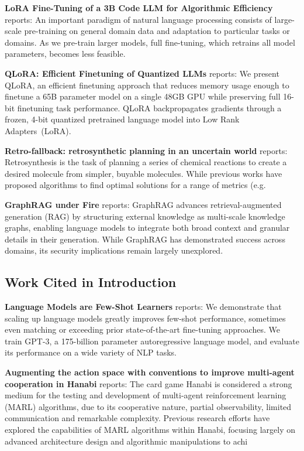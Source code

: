 \documentclass[10pt,journal,compsoc,twocolumn]{IEEEtran}
\begin{document}
\textbf{LoRA Fine-Tuning of a 3B Code LLM for Algorithmic Efficiency} \cite{crossref_10_48550_arxiv_2106_09685} reports: An important paradigm of natural language processing consists of large-scale pre-training on general domain data and adaptation to particular tasks or domains. As we pre-train larger models, full fine-tuning, which retrains all model parameters, becomes less feasible.

\textbf{QLoRA: Efficient Finetuning of Quantized LLMs} \cite{crossref_10_48550_arxiv_2305_14314} reports: We present QLoRA, an efficient finetuning approach that reduces memory usage enough to finetune a 65B parameter model on a single 48GB GPU while preserving full 16-bit finetuning task performance. QLoRA backpropagates gradients through a frozen, 4-bit quantized pretrained language model into Low Rank Adapters~(LoRA).

\textbf{Retro-fallback: retrosynthetic planning in an uncertain world} \cite{arxiv_2310_09270} reports: Retrosynthesis is the task of planning a series of chemical reactions to create a desired molecule from simpler, buyable molecules. While previous works have proposed algorithms to find optimal solutions for a range of metrics (e.g.

\textbf{GraphRAG under Fire} \cite{arxiv_2501_14050} reports: GraphRAG advances retrieval-augmented generation (RAG) by structuring external knowledge as multi-scale knowledge graphs, enabling language models to integrate both broad context and granular details in their generation. While GraphRAG has demonstrated success across domains, its security implications remain largely unexplored.


\subsection{Work Cited in Introduction}


\textbf{Language Models are Few-Shot Learners} \cite{arxiv_2005_14165} reports: We demonstrate that scaling up language models greatly improves few-shot performance, sometimes even matching or exceeding prior state-of-the-art fine-tuning approaches. We train GPT-3, a 175-billion parameter autoregressive language model, and evaluate its performance on a wide variety of NLP tasks.

\textbf{Augmenting the action space with conventions to improve multi-agent cooperation in Hanabi} \cite{arxiv_2412_06333} reports: The card game Hanabi is considered a strong medium for the testing and development of multi-agent reinforcement learning (MARL) algorithms, due to its cooperative nature, partial observability, limited communication and remarkable complexity. Previous research efforts have explored the capabilities of MARL algorithms within Hanabi, focusing largely on advanced architecture design and algorithmic manipulations to achi
\end{document}
